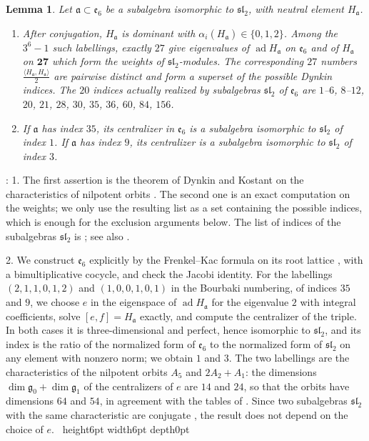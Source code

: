 \documentclass[leqno]{article}
\newcommand{\qed}{\hfill \vrule height6pt  width6pt depth0pt}
\newtheorem{lemma}[thm]{Lemma}
\newenvironment{proof}[1][]{\noindent {\it Proof #1} : }{\hbox{~}\qed
\smallskip
}
\numberwithin{equation}{section}
\begin{document}
\begin{lemma}
\label{lem:sl2-e6}
Let $\mathfrak a \subset \mathfrak e_6$ be a subalgebra isomorphic to $\mathfrak{sl}_2$, with neutral element $H_{\mathfrak a}$.
\begin{enumerate}
\item After conjugation, $H_{\mathfrak a}$ is dominant with $\alpha_i(H_{\mathfrak a}) \in \{0,1,2\}$. Among the $3^6-1$ such labellings, exactly $27$ give eigenvalues of $\operatorname{ad}H_{\mathfrak a}$ on $\mathfrak e_6$ and of $H_{\mathfrak a}$ on $\mathbf{27}$ which form the weights of $\mathfrak{sl}_2$-modules. The corresponding $27$ numbers $\frac{\langle H_{\mathfrak a},H_{\mathfrak a}\rangle}{2}$ are pairwise distinct and form a superset of the possible Dynkin indices. The $20$ indices actually realized by subalgebras $\mathfrak{sl}_2$ of $\mathfrak e_6$ are $1$--$6$, $8$--$12$, $20$, $21$, $28$, $30$, $35$, $36$, $60$, $84$, $156$.
\item If $\mathfrak a$ has index $35$, its centralizer in $\mathfrak e_6$ is a subalgebra isomorphic to $\mathfrak{sl}_2$ of index $1$. If $\mathfrak a$ has index $9$, its centralizer is a subalgebra isomorphic to $\mathfrak{sl}_2$ of index $3$.
\end{enumerate}
\end{lemma}

\begin{proof}
1. The first assertion is the theorem of Dynkin and Kostant on the characteristics of nilpotent orbits \cite[Chapter 3]{CoM93}. The second one is an exact computation on the weights; we only use the resulting list as a set containing the possible indices, which is enough for the exclusion arguments below. The list of indices of the subalgebras $\mathfrak{sl}_2$ is \cite[Table 18]{Dyn52}; see also \cite[p.~16]{Gan19}.

2. We construct $\mathfrak e_6$ explicitly by the Frenkel--Kac formula on its root lattice \cite{FrK80}, with a bimultiplicative cocycle, and check the Jacobi identity. For the labellings $(2,1,1,0,1,2)$ and $(1,0,0,1,0,1)$ in the Bourbaki numbering, of indices $35$ and $9$, we choose $e$ in the eigenspace of $\operatorname{ad}H_{\mathfrak a}$ for the eigenvalue $2$ with integral coefficients, solve $[e,f] = H_{\mathfrak a}$ exactly, and compute the centralizer of the triple. In both cases it is three-dimensional and perfect, hence isomorphic to $\mathfrak{sl}_2$, and its index is the ratio of the normalized form of $\mathfrak e_6$ to the normalized form of $\mathfrak{sl}_2$ on any element with nonzero norm; we obtain $1$ and $3$. The two labellings are the characteristics of the nilpotent orbits $A_5$ and $2A_2+A_1$: the dimensions $\dim\mathfrak g_0+\dim\mathfrak g_1$ of the centralizers of $e$ are $14$ and $24$, so that the orbits have dimensions $64$ and $54$, in agreement with the tables of \cite[Chapter 8]{CoM93}. Since two subalgebras $\mathfrak{sl}_2$ with the same characteristic are conjugate \cite[Chapter 3]{CoM93}, the result does not depend on the choice of $e$.
\end{proof}
\end{document}
